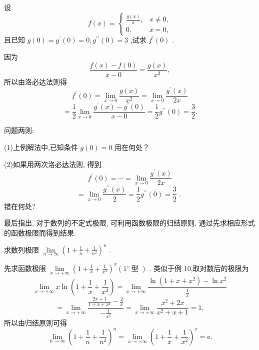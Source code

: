 \begin{example}
设
\[
f\left( x\right)  = \left\{  \begin{array}{ll} \frac{g\left( x\right) }{x}, & x \neq  0, \\  0, & x = 0, \end{array}\right.
\]
且已知 \(g\left( 0\right)  = {g}^{\prime }\left( 0\right)  = 0,{g}^{\prime \prime }\left( 0\right)  = 3\) ,试求 \({f}^{\prime }\left( 0\right)\) .
\end{example}


\begin{solution}
因为
\[
\frac{f\left( x\right)  - f\left( 0\right) }{x - 0} = \frac{g\left( x\right) }{{x}^{2}},
\]
所以由洛必达法则得
\[
{f}^{\prime }\left( 0\right)  = \mathop{\lim }\limits_{{x \rightarrow  0}}\frac{g\left( x\right) }{{x}^{2}} = \mathop{\lim }\limits_{{x \rightarrow  0}}\frac{{g}^{\prime }\left( x\right) }{2x}
\]
\[
= \frac{1}{2}\mathop{\lim }\limits_{{x \rightarrow  0}}\frac{{g}^{\prime }\left( x\right)  - {g}^{\prime }\left( 0\right) }{x - 0} = \frac{1}{2}{g}^{\prime \prime }\left( 0\right)  = \frac{3}{2}.
\]
\end{solution}

问题两则:

(1)上例解法中,已知条件 \(g\left( 0\right)  = 0\) 用在何处？

(2)如果用两次洛必达法则, 得到
\[
{f}^{\prime }\left( 0\right)  = \cdots  = \mathop{\lim }\limits_{{x \rightarrow  0}}\frac{{g}^{\prime }\left( x\right) }{2x}
\]
\[
= \mathop{\lim }\limits_{{x \rightarrow  0}}\frac{{g}^{\prime \prime }\left( x\right) }{2} = \frac{1}{2}{g}^{\prime \prime }\left( 0\right)  = \frac{3}{2}\text{ . }
\]
错在何处?

最后指出, 对于数列的不定式极限, 可利用函数极限的归结原则, 通过先求相应形式的函数极限而得到结果.

\begin{example}
求数列极限 \(\mathop{\lim }\limits_{{n \rightarrow  \infty }}{\left( 1 + \frac{1}{n} + \frac{1}{{n}^{2}}\right) }^{n}\) .

\end{example}

\begin{solution}
先求函数极限 \(\mathop{\lim }\limits_{{x \rightarrow   + \infty }}{\left( 1 + \frac{1}{x} + \frac{1}{{x}^{2}}\right) }^{x}\left( {1{^\circ}\text{ 型 }}\right)\) . 类似于例 10,取对数后的极限为
\[
\mathop{\lim }\limits_{{x \rightarrow   + \infty }}x\ln \left( {1 + \frac{1}{x} + \frac{1}{{x}^{2}}}\right)  = \mathop{\lim }\limits_{{x \rightarrow   + \infty }}\frac{\ln \left( {1 + x + {x}^{2}}\right)  - \ln {x}^{2}}{\frac{1}{x}}
\]
\[
= \mathop{\lim }\limits_{{x \rightarrow   + \infty }}\frac{\frac{{2x} + 1}{1 + x + {x}^{2}} - \frac{2}{x}}{-\frac{1}{{x}^{2}}} = \mathop{\lim }\limits_{{x \rightarrow   + \infty }}\frac{{x}^{2} + {2x}}{{x}^{2} + x + 1} = 1,
\]
所以由归结原则可得
\[
\mathop{\lim }\limits_{{n \rightarrow  \infty }}{\left( 1 + \frac{1}{n} + \frac{1}{{n}^{2}}\right) }^{n} = \mathop{\lim }\limits_{{x \rightarrow   + \infty }}{\left( 1 + \frac{1}{x} + \frac{1}{{x}^{2}}\right) }^{x} = \mathrm{e}.
\]
\end{solution}

